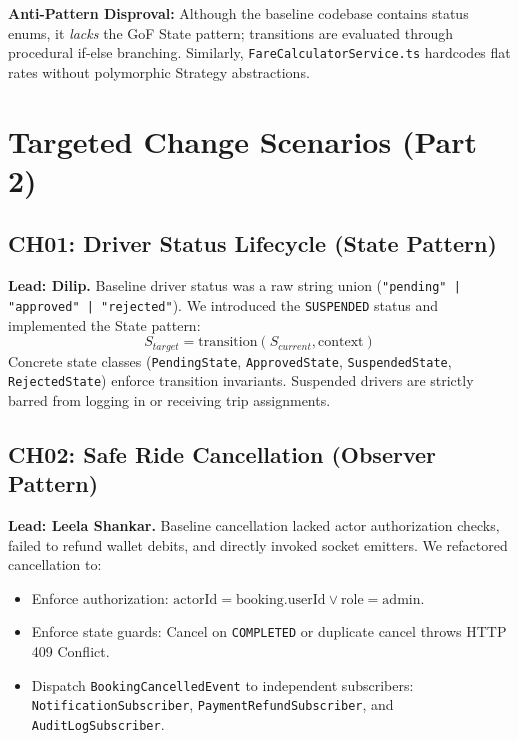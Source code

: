 \documentclass[conference]{IEEEtran}
\begin{document}
\textbf{Anti-Pattern Disproval:} Although the baseline codebase contains status enums, it \textit{lacks} the GoF State pattern; transitions are evaluated through procedural if-else branching. Similarly, \texttt{FareCalculatorService.ts} hardcodes flat rates without polymorphic Strategy abstractions.

\section{Targeted Change Scenarios (Part 2)}

\subsection{CH01: Driver Status Lifecycle (State Pattern)}
\textbf{Lead: Dilip.} Baseline driver status was a raw string union (\texttt{"pending" | "approved" | "rejected"}). We introduced the \texttt{SUSPENDED} status and implemented the State pattern:
\begin{equation}
S_{target} = \text{transition}(S_{current}, \text{context})
\end{equation}
Concrete state classes (\texttt{PendingState}, \texttt{ApprovedState}, \texttt{SuspendedState}, \texttt{RejectedState}) enforce transition invariants. Suspended drivers are strictly barred from logging in or receiving trip assignments.

\subsection{CH02: Safe Ride Cancellation (Observer Pattern)}
\textbf{Lead: Leela Shankar.} Baseline cancellation lacked actor authorization checks, failed to refund wallet debits, and directly invoked socket emitters. We refactored cancellation to:
\begin{itemize}
    \item Enforce authorization: $\text{actorId} = \text{booking.userId} \lor \text{role} = \text{admin}$.
    \item Enforce state guards: Cancel on \texttt{COMPLETED} or duplicate cancel throws HTTP 409 Conflict.
    \item Dispatch \texttt{BookingCancelledEvent} to independent subscribers: \texttt{NotificationSubscriber}, \texttt{PaymentRefundSubscriber}, and \texttt{AuditLogSubscriber}.
\end{itemize}
\end{document}
